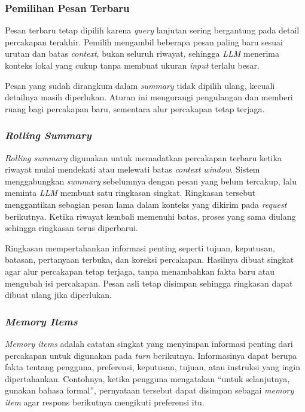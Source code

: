 \subsubsection{Pemilihan Pesan Terbaru}
\label{subsubsec:pemilihan-pesan-terbaru}

Pesan terbaru tetap dipilih karena \emph{query} lanjutan sering bergantung pada detail
percakapan terakhir. Pemilih mengambil beberapa pesan paling baru sesuai urutan dan
batas \emph{context}, bukan seluruh riwayat, sehingga \emph{LLM} menerima konteks lokal yang
cukup tanpa membuat ukuran \emph{input} terlalu besar.

Pesan yang sudah dirangkum dalam \emph{summary} tidak dipilih ulang, kecuali detailnya
masih diperlukan. Aturan ini mengurangi pengulangan dan memberi ruang bagi percakapan
baru, sementara alur percakapan tetap terjaga.

\subsubsection{\emph{Rolling Summary}}
\label{subsubsec:rolling-summary}

\emph{Rolling summary} digunakan untuk memadatkan percakapan terbaru ketika riwayat
mulai mendekati atau melewati batas \emph{context window}. Sistem menggabungkan
\emph{summary} sebelumnya dengan pesan yang belum tercakup, lalu meminta \emph{LLM} membuat
satu ringkasan singkat. Ringkasan tersebut menggantikan sebagian pesan lama dalam
konteks yang dikirim pada \emph{request} berikutnya. Ketika riwayat kembali memenuhi
batas, proses yang sama diulang sehingga ringkasan terus diperbarui.

Ringkasan mempertahankan informasi penting seperti tujuan, keputusan, batasan,
pertanyaan terbuka, dan koreksi percakapan. Hasilnya dibuat singkat agar alur
percakapan tetap terjaga, tanpa menambahkan fakta baru atau mengubah isi percakapan.
Pesan asli tetap disimpan sehingga ringkasan dapat dibuat ulang jika diperlukan.

\subsubsection{\emph{Memory Items}}
\label{subsubsec:memory-items}

\emph{Memory items} adalah catatan singkat yang menyimpan informasi penting dari
percakapan untuk digunakan pada \emph{turn} berikutnya. Informasinya dapat berupa
fakta tentang pengguna, preferensi, keputusan, tujuan, atau instruksi yang ingin
dipertahankan. Contohnya, ketika pengguna mengatakan ``untuk selanjutnya, gunakan
bahasa formal'', pernyataan tersebut dapat disimpan sebagai \emph{memory item} agar
respons berikutnya mengikuti preferensi itu.

